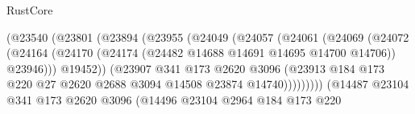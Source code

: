 \begin{lexlean}{RustCore}
\begin{coremodule}
                                    (@23540
                                      (@23801
                                        (@23894
                                          (@23955
                                            (@24049
                                              (@24057
                                                (@24061
                                                  (@24069
                                                    (@24072
                                                      (@24164
                                                        (@24170
                                                          (@24174
                                                            (@24482
                                                              @14688
                                                              @14691
                                                              @14695
                                                              @14700
                                                              @14706))
                                                          @23946)))
                                                    @19452))
                                                (@23907
                                                  @341
                                                  @173
                                                  @2620
                                                  @3096
                                                  (@23913
                                                    @184
                                                    @173
                                                    @220
                                                    @27
                                                    @2620
                                                    @2688
                                                    @3094
                                                    @14508
                                                    @23874
                                                    @14740)))))))))
                                  (@14487
                                    @23104
                                    @341
                                    @173
                                    @2620
                                    @3096
                                    (@14496
                                      @23104
                                      @2964
                                      @184
                                      @173
                                      @220

\end{coremodule}
\end{lexlean}
